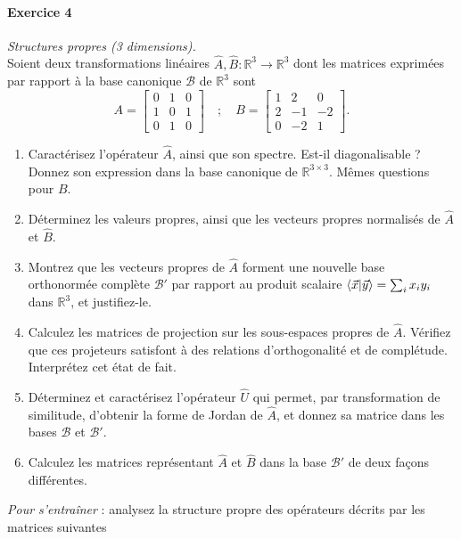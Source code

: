 \paragraph{Exercice 4} \textit{Structures propres (3 dimensions).} \\
Soient deux transformations linéaires $\hat A,\hat B : \mathbb{R}^3 \to \mathbb{R}^3$ dont les matrices exprimées par rapport à la base canonique $\mathscr B$ de $\mathbb{R}^3$ sont
\begin{equation}
A = \left[ \begin{array}{ccc}
0 & 1 & 0 \\ 
1 & 0 & 1 \\ 
0 & 1 & 0
\end{array} \right] \quad ; \quad
B = \left[ \begin{array}{ccc}
1 & 2 & 0 \\ 
2 & -1 & -2 \\ 
0 & -2 & 1
\end{array} \right].
\end{equation}
\begin{enumerate}
\item Caractérisez l'opérateur $\hat A$, ainsi que son spectre. Est-il diagonalisable ? Donnez son expression dans la base canonique de $\mathbb R^{3\times 3}$. Mêmes questions pour $B$.
\item Déterminez les valeurs propres, ainsi que les vecteurs propres normalisés de $\hat A$ et $\hat B$. 
\item Montrez que les vecteurs propres de $\hat A$ forment une nouvelle base orthonormée complète $\mathscr B'$ par rapport au produit scalaire $\braket{\vec x}{\vec y} = \sum_i x_i y_i$ dans $\mathbb R^3$, et justifiez-le. 
\item Calculez les matrices de projection sur les sous-espaces propres de $\hat A$. Vérifiez que ces projeteurs satisfont à des relations d'orthogonalité et de complétude. Interprétez cet état de fait.
\item Déterminez et caractérisez l'opérateur $\hat U$ qui permet, par transformation de similitude, d'obtenir la forme de Jordan de $\hat A$, et donnez sa matrice dans les bases $\mathscr B$ et $\mathscr B'$.
\item Calculez les matrices représentant $\hat A$ et $\hat B$ dans la base $\mathscr B'$ de deux façons différentes.
\end{enumerate}
\textit{Pour s'entraîner} : analysez la structure propre des opérateurs décrits par les matrices suivantes
